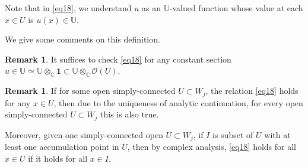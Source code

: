 \documentclass[12pt,a4paper,notitlepage]{article}
\theoremstyle{definition}
\newtheorem{rem}[df]{Remark}
\theoremstyle{plain}
\newcommand{\id}{\mathbf{1}}
\newcommand{\scr}{\mathscr}
\newcommand{\Ubb}{\mathbb U}
\newcommand{\Cbb}{\mathbb C}
\numberwithin{equation}{subsection}
\begin{document}
Note that in \eqref{eq18}, we understand $u$ as an $\Ubb$-valued function whose value at each $x\in U$ is $u(x)\in\Ubb$.

We give some comments on this definition.



\begin{rem}
It suffices to check \eqref{eq18} for any constant section $u\in\Ubb\simeq\Ubb\otimes_\Cbb\id\subset\Ubb\otimes_\Cbb\scr O(U)$.
\end{rem}

\begin{rem}\label{lb9}
If for some open simply-connected $U\subset W_j$, the relation \eqref{eq18} holds for any $x\in U$, then due to the uniqueness of analytic continuation, for every open simply-connected $U\subset W_j$ this is also true.

Moreover, given one simply-connected open $U\subset W_j$, if $I$ is subset of $U$ with at least one accumulation point in $U$, then by complex analysis, \eqref{eq18} holds for all $x\in U$ if it holds for all $x\in I$.
\end{rem}
\end{document}
